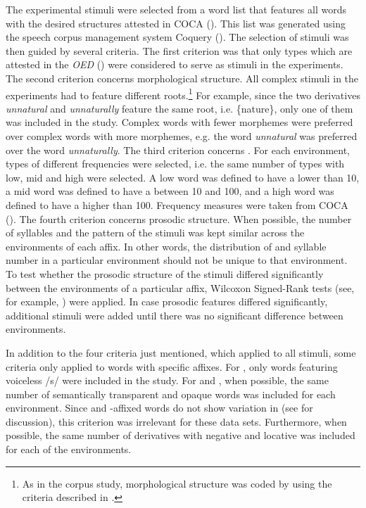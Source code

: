 The experimental stimuli were selected from a word list that features all words with the desired structures attested in  {COCA} (\citealt{Davies.20082014}). This list was generated using the speech corpus management system Coquery (\citealt{Kunter.2016}). The selection of stimuli was then guided by several criteria. 
The first criterion was that only types which are attested in the \textit{OED} (\citealt{OED.2013}) were considered to serve as stimuli in the experiments. 
The second criterion concerns morphological structure. All complex stimuli in the experiments had to feature different roots.\footnote{As in the corpus study, morphological structure was coded by using the criteria described in .} For example, since the two derivatives \textit{unnatural} and \textit{unnaturally} feature the same root, i.e. \{nature\}, only one of them was included in the study. Complex words with fewer morphemes were preferred over complex words with more morphemes, e.g. the word \textit{unnatural} was preferred over the word \textit{unnaturally}. 
 The third criterion concerns . For each environment, types of different frequencies were selected, i.e. the same number of types with low, mid and high  were selected. A low  word was defined to have a  lower than 10, a mid  word was defined to have a  between 10 and 100, and a high  word was defined to have a  higher than 100. Frequency measures were taken from  {COCA} (\citealt{Davies.20082014}).
  The fourth criterion concerns prosodic structure. When possible, the number of syllables and the  pattern of the stimuli was kept similar across the environments of each affix. In other words, the distribution of  and syllable number in a particular environment should not be unique to that environment. To test whether the prosodic structure of the stimuli differed significantly between the environments of a particular affix, Wilcoxon Signed-Rank tests (see, for example, \citealt[Chapter 5]{Crawley.2012}) were applied. In case prosodic features differed significantly, additional stimuli were added until there was no significant difference between environments.
 
 In addition to the four criteria just mentioned, which applied to all stimuli, some criteria only applied to words with specific affixes. 
 For , only words featuring voiceless /s/ were included in the study. 
  For  and , when possible, the same number of semantically transparent and opaque words was included for each environment. Since  and -affixed words do not show variation in  (see  for discussion), this criterion was irrelevant for these data sets.
 Furthermore, when possible, the same number of derivatives with negative and locative  was included for each of the environments. 
 
